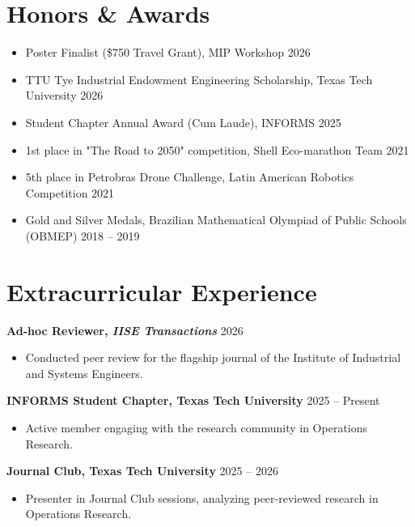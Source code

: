 \documentclass[letterpaper,10pt]{article}
\newcommand{\dategray}[1]{\textcolor{textgray}{#1}}
\begin{document}
\section{Honors \& Awards}
\begin{itemize}[leftmargin=14pt, nosep, topsep=2pt, itemsep=2pt]
    \item Poster Finalist (\$750 Travel Grant), MIP Workshop \hfill \dategray{2026}
    \item TTU Tye Industrial Endowment Engineering Scholarship, Texas Tech University \hfill \dategray{2026}
    \item Student Chapter Annual Award (Cum Laude), INFORMS \hfill \dategray{2025}
    \item 1st place in "The Road to 2050" competition, Shell Eco-marathon Team \hfill \dategray{2021}
    \item 5th place in Petrobras Drone Challenge, Latin American Robotics Competition \hfill \dategray{2021}
    \item Gold and Silver Medals, Brazilian Mathematical Olympiad of Public Schools (OBMEP) \hfill \dategray{2018 – 2019}
\end{itemize}

\section{Extracurricular Experience}
\textbf{Ad-hoc Reviewer, \textit{IISE Transactions}} \hfill \dategray{2026}
\begin{itemize}[leftmargin=14pt, nosep, topsep=2pt, after=\vspace{4pt}]
    \item Conducted peer review for the flagship journal of the Institute of Industrial and Systems Engineers.
\end{itemize}

\textbf{INFORMS Student Chapter, Texas Tech University} \hfill \dategray{2025 – Present}
\begin{itemize}[leftmargin=14pt, nosep, topsep=2pt, after=\vspace{4pt}]
    \item Active member engaging with the research community in Operations Research.
\end{itemize}

\textbf{Journal Club, Texas Tech University} \hfill \dategray{2025 – 2026}
\begin{itemize}[leftmargin=14pt, nosep, topsep=2pt, after=\vspace{4pt}]
    \item Presenter in Journal Club sessions, analyzing peer-reviewed research in Operations Research.
\end{itemize}
\end{document}
